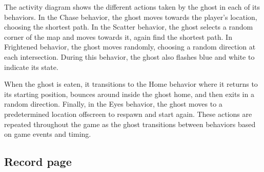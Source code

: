\documentclass[11pt]{article}
\begin{document}
The activity diagram shows the different actions taken by the ghost in each of its behaviors. In the Chase behavior, the ghost moves towards the player's location, choosing the shortest path. In the Scatter behavior, the ghost selects a random corner of the map and moves towards it, again find the shortest path. In Frightened behavior, the ghost moves randomly, choosing a random direction at each intersection. During this behavior, the ghost also flashes blue and white to indicate its state.

When the ghost is eaten, it transitions to the Home behavior where it returns to its starting position, bounces around inside the ghost home, and then exits in a random direction. Finally, in the Eyes behavior, the ghost moves to a predetermined location offscreen to respawn and start again. These actions are repeated throughout the game as the ghost transitions between behaviors based on game events and timing.

\subsection{Record page}
\end{document}
